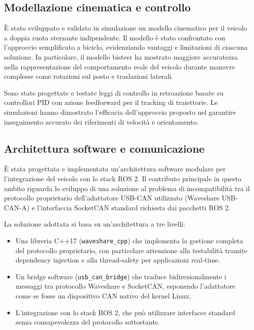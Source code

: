 \subsection{Modellazione cinematica e controllo}

È stato sviluppato e validato in simulazione un modello cinematico per il veicolo a doppia ruota sterzante indipendente. Il modello è stato confrontato con l'approccio semplificato a biciclo, evidenziando vantaggi e limitazioni di ciascuna soluzione. In particolare, il modello bisteer ha mostrato maggiore accuratezza nella rappresentazione del comportamento reale del veicolo durante manovre complesse come rotazioni sul posto e traslazioni laterali.

Sono state progettate e testate leggi di controllo in retroazione basate su controllori PID con azione feedforward per il tracking di traiettorie. Le simulazioni hanno dimostrato l'efficacia dell'approccio proposto nel garantire inseguimento accurato dei riferimenti di velocità e orientamento.

\subsection{Architettura software e comunicazione}

È stata progettata e implementata un'architettura software modulare per l'integrazione del veicolo con lo stack ROS 2. Il contributo principale in questo ambito riguarda lo sviluppo di una soluzione al problema di incompatibilità tra il protocollo proprietario dell'adattatore USB-CAN utilizzato (Waveshare USB-CAN-A) e l'interfaccia SocketCAN standard richiesta dai pacchetti ROS 2.

La soluzione adottata si basa su un'architettura a tre livelli:
\begin{itemize}
    \item Una libreria C++17 (\texttt{waveshare\_cpp}) che implementa la gestione completa del protocollo proprietario, con particolare attenzione alla testabilità tramite dependency injection e alla thread-safety per applicazioni real-time.
    \item Un bridge software (\texttt{usb\_can\_bridge}) che traduce bidirezionalmente i messaggi tra protocollo Waveshare e SocketCAN, esponendo l'adattatore come se fosse un dispositivo CAN nativo del kernel Linux.
    \item L'integrazione con lo stack ROS 2, che può utilizzare interfacce standard senza consapevolezza del protocollo sottostante.
\end{itemize}

